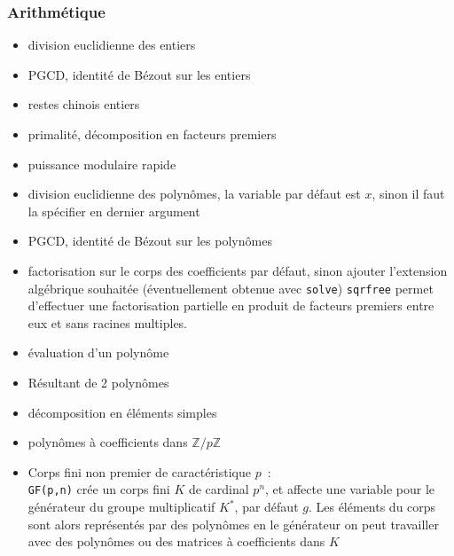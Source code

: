 \documentclass[a4paper,11pt]{article}
\begin{document}
\begin{giacjshere}
\subsubsection{Arithm\'etique}
\begin{itemize}
\item division euclidienne des entiers
\item PGCD, identit\'e de B\'ezout sur les entiers
\item restes chinois entiers
\item primalit\'e, d\'ecomposition en facteurs premiers
\item puissance modulaire rapide
\item division euclidienne des polyn\^omes, la variable par d\'efaut est $x$,
sinon il faut la sp\'ecifier en dernier argument
\item PGCD, identit\'e de B\'ezout sur les polyn\^omes
\item factorisation sur le corps des coefficients par d\'efaut, sinon 
ajouter l'extension alg\'ebrique souhait\'ee (\'eventuellement obtenue
avec \verb|solve|)
\verb|sqrfree| permet d'effectuer une factorisation partielle
en produit de facteurs premiers entre eux et sans racines multiples.
\item \'evaluation d'un polyn\^ome
\item R\'esultant de 2 polyn\^omes
\item d\'ecomposition en \'el\'ements simples
\item polyn\^omes \`a coefficients dans $\mathbb{Z}/p\mathbb{Z}$
\item Corps fini non premier de caract\'eristique $p$~:\\
\verb|GF(p,n)| cr\'ee un corps fini $K$ de cardinal $p^n$, 
et affecte une variable
pour le g\'en\'erateur du groupe multiplicatif $K^*$, par
d\'efaut $g$. Les \'el\'ements du corps sont alors repr\'esent\'es
par des polyn\^omes en le g\'en\'erateur
on peut travailler avec des polyn\^omes ou des matrices
\`a coefficients dans $K$
\end{itemize}


\end{giacjshere}
\end{document}
